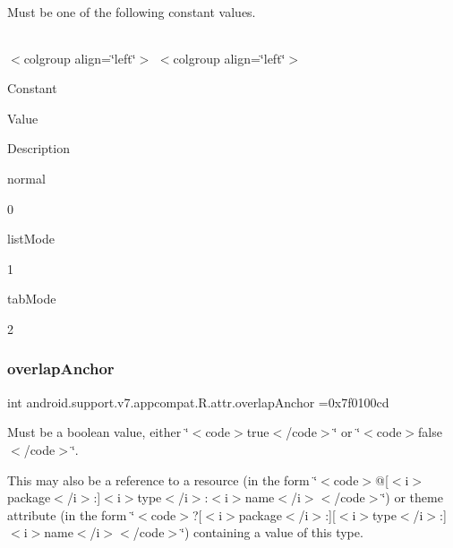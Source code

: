Must be one of the following constant values.

\tabulinesep=1mm
\begin{longtabu} spread 0pt [c]{*{0}{|X[-1]}|}
\hline
\end{longtabu}
$<$colgroup align=\char`\"{}left\char`\"{}$>$ $<$colgroup align=\char`\"{}left\char`\"{}$>$ 

Constant

Value

Description 

{\ttfamily normal}

0

{\ttfamily list\+Mode}

1

{\ttfamily tab\+Mode}

2\mbox{\label{classandroid_1_1support_1_1v7_1_1appcompat_1_1R_1_1attr_ad62e549e49cbd9c72df304e753d22158}} 
\subsubsection{\texorpdfstring{overlap\+Anchor}{overlapAnchor}}
{\footnotesize\ttfamily int android.\+support.\+v7.\+appcompat.\+R.\+attr.\+overlap\+Anchor =0x7f0100cd\hspace{0.3cm}{\ttfamily [static]}}

Must be a boolean value, either \char`\"{}$<$code$>$true$<$/code$>$\char`\"{} or \char`\"{}$<$code$>$false$<$/code$>$\char`\"{}. 

This may also be a reference to a resource (in the form \char`\"{}$<$code$>$@\mbox{[}$<$i$>$package$<$/i$>$\+:\mbox{]}$<$i$>$type$<$/i$>$\+:$<$i$>$name$<$/i$>$$<$/code$>$\char`\"{}) or theme attribute (in the form \char`\"{}$<$code$>$?\mbox{[}$<$i$>$package$<$/i$>$\+:\mbox{]}\mbox{[}$<$i$>$type$<$/i$>$\+:\mbox{]}$<$i$>$name$<$/i$>$$<$/code$>$\char`\"{}) containing a value of this type. \mbox{\label{classandroid_1_1support_1_1v7_1_1appcompat_1_1R_1_1attr_a53f8fb182350de961ffa4ba1b786cb3a}} 
